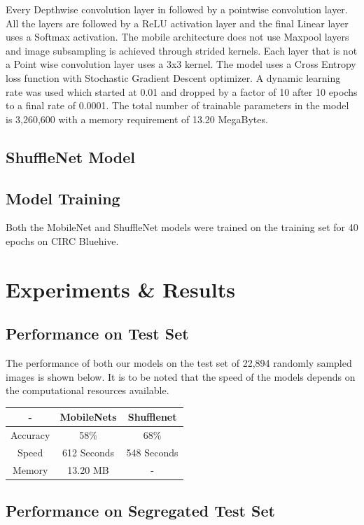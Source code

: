 \documentclass[10pt,twocolumn,letterpaper]{article}
\begin{document}
Every Depthwise convolution layer in followed by a pointwise convolution layer. All the layers are followed by a ReLU activation layer and the final Linear layer uses a Softmax activation. The mobile architecture does not use Maxpool layers and image subsampling is achieved through strided kernels. Each layer that is not a Point wise convolution layer uses a 3x3 kernel. The model uses a Cross Entropy loss function with Stochastic Gradient Descent optimizer. A dynamic learning rate was used which started at 0.01 and dropped by a factor of 10 after 10 epochs to a final rate of 0.0001. 
The total number of trainable parameters in the model is  3,260,600 with a memory requirement of 13.20 MegaBytes.   

\subsection{ShuffleNet Model}

\subsection{Model Training}
Both the MobileNet and ShuffleNet models were trained on the training set for 40 epochs on CIRC Bluehive.

\section{Experiments \& Results}

\subsection{Performance on Test Set}
The performance of both our models on the test set of 22,894 randomly sampled images is shown below. It is to be noted that the speed of the models depends on the computational resources available.

\begin{center}
\begin{tabular}{ |c|c|c| } 
 \hline
 - & MobileNets & Shufflenet \\ 
 \hline
 Accuracy & 58\% & 68\% \\
 \hline
 Speed  & 612 Seconds & 548 Seconds \\ 
 \hline
 Memory & 13.20 MB & - \\ 
 \hline
\end{tabular}
\end{center}

\subsection{Performance on Segregated Test Set}
\end{document}
